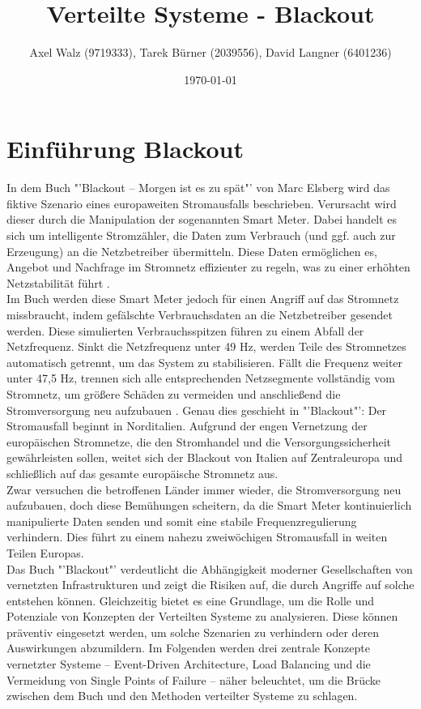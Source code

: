 \documentclass[a4paper,12pt]{article}
\title{Verteilte Systeme - Blackout}
\author{Axel Walz (9719333), Tarek Bürner (2039556), David Langner (6401236)}
\date{\today}
\let\stdsection\section
\renewcommand\section{\newpage\stdsection}
\begin{document}
\onehalfspacing 

\maketitle

\newpage 
\tableofcontents
\newpage 
\pagestyle{plain}


\section{Einführung Blackout}
In dem Buch "'Blackout – Morgen ist es zu spät"' von Marc Elsberg wird das fiktive Szenario eines europaweiten Stromausfalls beschrieben. Verursacht wird dieser durch die Manipulation der sogenannten Smart Meter. Dabei handelt es sich um intelligente Stromzähler, die Daten zum Verbrauch (und ggf. auch zur Erzeugung) an die Netzbetreiber übermitteln. Diese Daten ermöglichen es, Angebot und Nachfrage im Stromnetz effizienter zu regeln, was zu einer erhöhten Netzstabilität führt \cite{SmartMeter}. \\
Im Buch werden diese Smart Meter jedoch für einen Angriff auf das Stromnetz missbraucht, indem gefälschte Verbrauchsdaten an die Netzbetreiber gesendet werden. Diese simulierten Verbrauchsspitzen führen zu einem Abfall der Netzfrequenz. Sinkt die Netzfrequenz unter 49 Hz, werden Teile des Stromnetzes automatisch getrennt, um das System zu stabilisieren. Fällt die Frequenz weiter unter 47,5 Hz, trennen sich alle entsprechenden Netzsegmente vollständig vom Stromnetz, um größere Schäden zu vermeiden und anschließend die Stromversorgung neu aufzubauen \cite{Netzfrequenz}. Genau dies geschieht in "'Blackout"': Der Stromausfall beginnt in Norditalien. Aufgrund der engen Vernetzung der europäischen Stromnetze, die den Stromhandel und die Versorgungssicherheit gewährleisten sollen, weitet sich der Blackout von Italien auf Zentraleuropa und schließlich auf das gesamte europäische Stromnetz aus.\\
Zwar versuchen die betroffenen Länder immer wieder, die Stromversorgung neu aufzubauen, doch diese Bemühungen scheitern, da die Smart Meter kontinuierlich manipulierte Daten senden und somit eine stabile Frequenzregulierung verhindern. Dies führt zu einem nahezu zweiwöchigen Stromausfall in weiten Teilen Europas.\\
Das Buch "'Blackout"' verdeutlicht die Abhängigkeit moderner Gesellschaften von vernetzten Infrastrukturen und zeigt die Risiken auf, die durch Angriffe auf solche entstehen können. Gleichzeitig bietet es eine Grundlage, um die Rolle und Potenziale von Konzepten der Verteilten Systeme zu analysieren. Diese können präventiv eingesetzt werden, um solche Szenarien zu verhindern oder deren Auswirkungen abzumildern. Im Folgenden werden drei zentrale Konzepte vernetzter Systeme – Event-Driven Architecture, Load Balancing und die Vermeidung von Single Points of Failure – näher beleuchtet, um die Brücke zwischen dem Buch und den Methoden verteilter Systeme zu schlagen.
\end{document}
